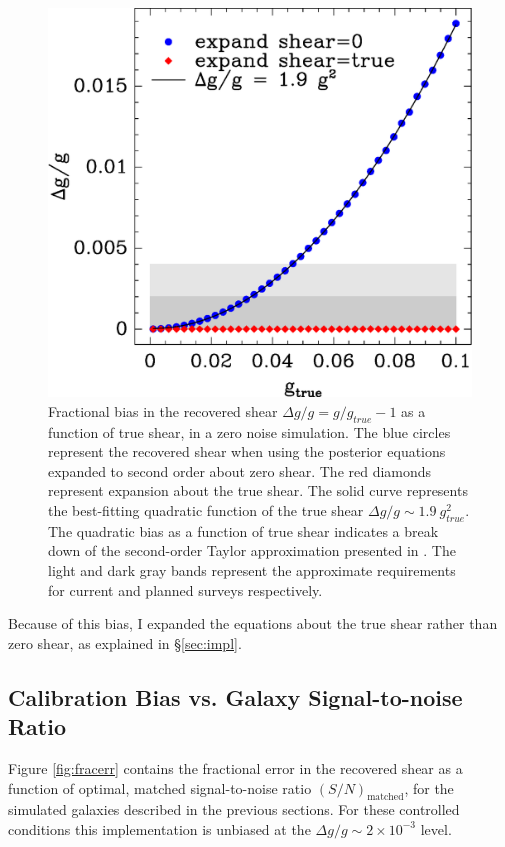 \documentclass[usegraphicx,usenatbib]{mn2e}
\newcommand{\Msn}{$(S/N)_{\textrm{matched}}$}
\begin{document}
\begin{figure}
 \includegraphics[scale=0.45]{figures/fracerr-vs-shear.eps}
 \caption{Fractional bias in the recovered shear $\Delta g/g = g/g_{true}-1$
     as a function of true shear,
     in a zero noise simulation.  The blue circles represent the recovered
     shear when using the posterior equations expanded to second order about
     zero shear.  The red diamonds represent expansion about the true shear.
     The solid curve represents the best-fitting quadratic function of the true
     shear $\Delta g/g \sim 1.9~g^2_{true}$.  The quadratic bias as a function of
     true shear indicates a break down of the second-order Taylor approximation
 presented in \citet{ba14}. The light and dark gray bands represent the
 approximate requirements for current and planned surveys respectively.}
 \label{fig:nonoise}
\end{figure}

Because of this bias, I expanded the equations about the true shear rather than
zero shear, as explained in \S \ref{sec:impl}.

\subsection{Calibration Bias vs. Galaxy Signal-to-noise Ratio} \label{sec:snbias}

Figure \ref{fig:fracerr} contains the fractional error in the recovered shear
as a function of optimal, matched signal-to-noise ratio \Msn, for the simulated
galaxies described in the previous sections.  For these controlled conditions
this implementation is unbiased at the $\Delta g/g \sim 2\times 10^{-3}$ level.
\end{document}
